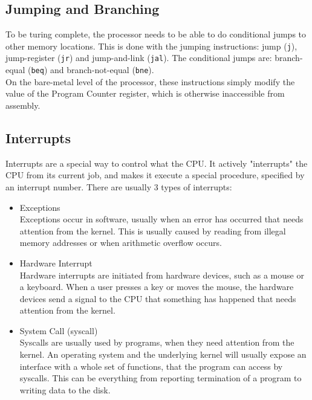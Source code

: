 \subsection{Jumping and Branching}
To be turing complete, the processor needs to be able to do conditional jumps
to other memory locations. This is done with the jumping instructions: jump
(\texttt{j}), jump-register (\texttt{jr}) and jump-and-link (\texttt{jal}). The
conditional jumps are: branch-equal (\texttt{beq}) and branch-not-equal
(\texttt{bne}).\\
On the bare-metal level of the processor, these instructions simply modify the
value of the Program Counter register, which is otherwise inaccessible from
assembly.

\subsection{Interrupts}
\label{sec:cpu_architecture_interrupts}
Interrupts are a special way to control what the CPU. It actively "interrupts"
the CPU from its current job, and makes it execute a special procedure,
specified by an interrupt number. There are usually 3 types of interrupts\cite{osdev:interrupts}:
\begin{itemize}
	\item Exceptions\\
	Exceptions occur in software, usually when an error has occurred that
	needs attention from the kernel. This is usually caused by reading from
	illegal memory addresses or when arithmetic overflow occurs.

	\item Hardware Interrupt\\
Hardware interrupts are initiated from hardware devices, such as a
mouse or a keyboard. When a user presses a key or moves the mouse, the hardware
devices send a signal to the CPU that something has happened that needs
attention from the kernel.

	\item System Call (syscall)\\
	Syscalls are usually used by programs, when they need attention from
the kernel. An operating system and the underlying kernel will usually expose
an interface with a whole set of functions, that the program can access by
syscalls. This can be everything from reporting termination of a program to
writing data to the disk.
\end{itemize}

